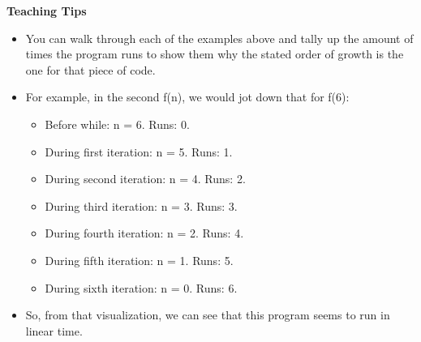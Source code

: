 \begin{guide}
   \textbf{Teaching Tips}
   \begin{itemize}
      \item You can walk through each of the examples above and tally up the amount of times the program runs to show them why the stated order of growth is the one for that piece of code.
      \item For example, in the second f(n), we would jot down that for f(6):
      \begin{itemize}
         \item Before while: n = 6. Runs: 0.
         \item During first iteration: n = 5. Runs: 1.
         \item During second iteration: n = 4. Runs: 2.
         \item During third iteration: n = 3. Runs: 3.
         \item During fourth iteration: n = 2. Runs: 4.
         \item During fifth iteration: n = 1. Runs: 5.
         \item During sixth iteration: n = 0. Runs: 6.
      \end{itemize}
      \item So, from that visualization, we can see that this program seems to run in linear time. 
   \end{itemize}
\end{guide}
